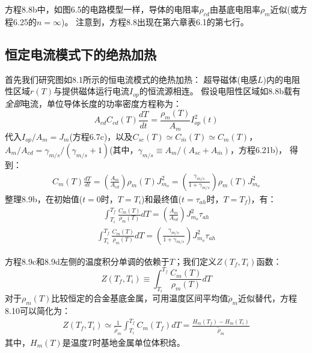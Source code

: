 方程8.8b中，如图6.5的电路模型一样，导体的电阻率$\rho_{cd}$由基底电阻率$\rho_m$近似(或方程6.25的$n=\infty$)。
注意到，方程8.8出现在第六章表6.1的第七行。

\subsection{恒定电流模式下的绝热加热}
首先我们研究图如8.1所示的恒电流模式的绝热加热：
超导磁体(电感$L$)内的电阻性区域$r(T)$与提供磁体运行电流$I_{op}$的恒流源相连。
假设电阻性区域如8.8b载有\textit{全部}电流，单位导体长度的功率密度方程称为：
\begin{equation}%
A_{cd}C_{cd}(T)\frac{dT}{dt}=\frac{\rho_m(T)}{A_m}I_{op}^{2}(t)
\end{equation}
代入$I_{op}/A_m=J_m$(方程6.7c)，以及$C_{sc}(T)\simeq C_{\bar{m}}(T)\simeq C_m(T)$，$A_m/A_{cd}=\gamma_{m/s}/(\gamma_{m/s}+1)$(其中，$\gamma_{m/s}\equiv A_m/(A_{sc}+A_{\bar{m}})$，方程6.21b)，
得到：
\begin{align*}%
C_m(T)\frac{dT}{dt}=\left(\frac{A_m}{A_{cd}}\right)\rho_m(T)J_{m_o}^{2}=\left(\frac{\gamma_{m/s}}{1+\gamma_{m/s}}\right)\rho_m(T)J_{m_o}^{2} \tag{8.9b}
\end{align*}
整理8.9b，在初始值($t=0$时，$T=T_i$)和最终值($t=\tau_{ah}$时，$T=T_f$)，有：
\begin{align*}%
\int_{T_i}^{T_f}\frac{C_m(T)}{\rho_m(T)}dT=\left(\frac{A_m}{A_{cd}}\right)J_{m_o}^{2}\tau_{ah} \tag{8.9c}
\end{align*}
\begin{align*}
\int_{T_i}^{T_f}\frac{C_m(T)}{\rho_m(T)}dT=\left(\frac{\gamma_{m/s}}{1+\gamma_{m/s}}\right)J_{m_o}^{2}\tau_{ah} \tag{8.9d}
\end{align*}

方程8.9c和8.9d左侧的温度积分单调的依赖于$T$；我们定义$Z(T_f,T_i)$函数：
\begin{equation}%
Z(T_f,T_i)\equiv\int_{T_i}^{T_f}\frac{C_m(T)}{\rho_m(T)}dT
\end{equation}
对于$\rho_m(T)$比较恒定的合金基底金属，可用温度区间平均值$\tilde{\rho}_m$近似替代，方程8.10可以简化为：
\begin{align*}%
Z(T_f,T_i)\simeq\frac{1}{\tilde{\rho}_m}\int_{T_i}^{T_f}C_m(T_f)dT=\frac{H_m(T_f)-H_m(T_i)}{\tilde{\rho}_m}\tag{8.10b}
\end{align*}
其中，$H_m(T)$是温度$T$时基地金属单位体积焓。

